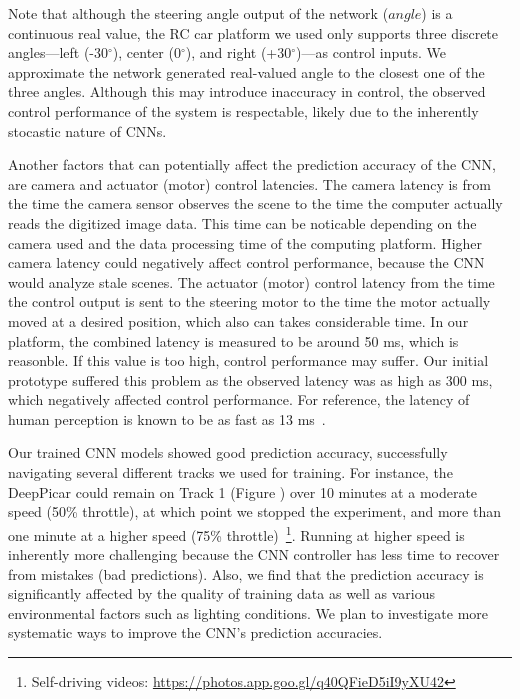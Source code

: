 Note that although the steering angle output of the network ($angle$) is
a continuous real value, the RC car platform we used only supports
three discrete angles---left (-30$^{\circ}$), center 
(0$^{\circ}$), and right (+30$^{\circ}$)---as control inputs.
We approximate the network generated real-valued angle to the closest
one of the three angles. Although this may introduce inaccuracy in
control, the observed control performance of the system is respectable,
likely due to the inherently stocastic nature of CNNs.


Another factors that can potentially affect the prediction accuracy of
the CNN, are camera and actuator (motor) control latencies. The camera
latency is from the time the camera sensor observes the scene to the
time the computer actually reads the digitized image data. This time
can be noticable depending on the camera used and the data processing
time of the computing platform. Higher camera latency could
negatively affect control performance, because the CNN would analyze
stale scenes. The actuator (motor) control latency from the time
the control output is sent to the steering motor to the time the motor
actually moved at a desired position, which also can takes
considerable time. In our platform, the combined latency is measured
to be around 50 ms, which is reasonble.
If this value is too high, control performance may suffer.
Our initial prototype suffered this problem as the observed latency
was as high as 300 ms, which negatively affected control performance.
For reference, the latency of human perception is known to be as fast
as 13 ms~\cite{ThomasBurger2015}. 

Our trained CNN models showed good prediction accuracy, successfully
navigating several different tracks we used for training.
For instance, the DeepPicar could remain on Track 1
(Figure \label{fig:track}) over 10 minutes at a moderate speed (50\%
throttle), at which point we stopped the experiment, and more than one
minute at a higher speed (75\% throttle)~\footnote{Self-driving videos: \url{https://photos.app.goo.gl/q40QFieD5iI9yXU42}
}. Running at
higher speed is inherently more challenging because the CNN controller
has less time to recover from mistakes (bad predictions).  Also, we
find that the prediction accuracy is significantly affected by the
quality of training data as well as various environmental factors such
as lighting conditions. We plan to investigate more systematic ways
to improve the CNN's prediction accuracies.

